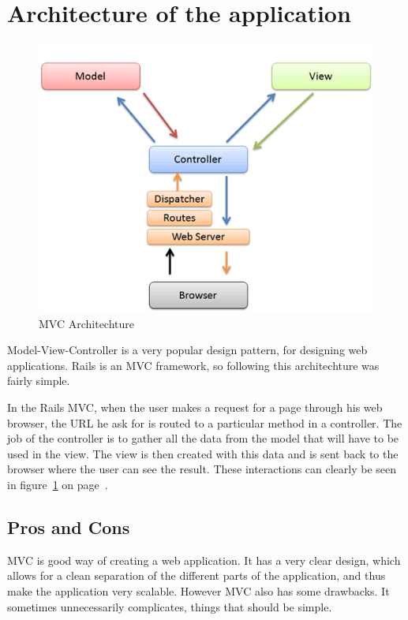 \documentclass[12pt,a4paper]{article}
\begin{document}
\section{Architecture of the application}

\begin{figure}[h]
	\centering
	\includegraphics[scale=0.5]{src/mvc.png}
	\caption{\label{fig:mvc} MVC Architechture}
\end{figure}

Model-View-Controller is a very popular design pattern, for designing web
applications. Rails is an MVC framework, so following this architechture was
fairly simple.

In the Rails MVC, when the user makes a request for a page through his web
browser, the URL he ask for is routed to a particular method in a controller.
The job of the controller is to gather all the data from the model that
will have to be used in the view. The view is then created with this data and is
sent back to the browser where the user can see the result. These interactions
can clearly be seen in figure~\ref{fig:mvc} on page~\pageref{fig:mvc}.


\subsection{Pros and Cons}

MVC is good way of creating a web application. It has a very clear design,
which allows for a clean separation of the different parts of the application,
and thus make the application very scalable. However MVC also has some
drawbacks. It sometimes unnecessarily complicates, things that should be simple.
\end{document}
